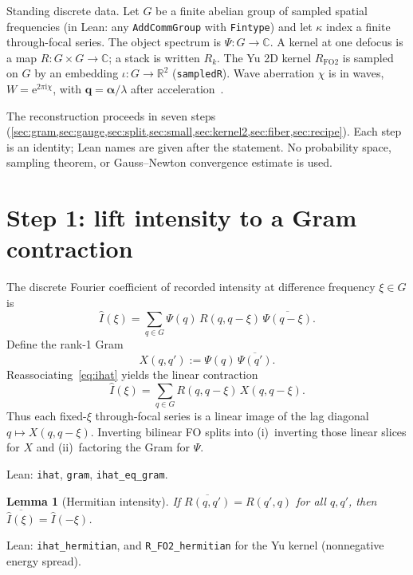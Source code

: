 \documentclass[11pt,a4paper]{article}
\newtheorem{lemma}[theorem]{Lemma}
\theoremstyle{definition}
\theoremstyle{remark}
\newcommand{\R}{\mathbb{R}}
\newcommand{\C}{\mathbb{C}}
\newcommand{\ee}{\mathrm{e}}
\newcommand{\ii}{\mathrm{i}}
\newcommand{\conj}[1]{\overline{#1}}
\newcommand{\RFOII}{R_{\mathrm{FO2}}}
\begin{document}
Standing discrete data.
Let $G$ be a finite abelian group of sampled spatial frequencies
(in Lean: any \texttt{AddCommGroup} with \texttt{Fintype}) and let
$\kappa$ index a finite through-focal series.
The object spectrum is $\Psi:G\to\C$.
A kernel at one defocus is a map $R:G\times G\to\C$; a stack is
written $R_k$.
The Yu 2D kernel $\RFOII$ is sampled on $G$ by an embedding
$\iota:G\to\R^2$ (\texttt{sampledR}).
Wave aberration $\chi$ is in waves, $W=\ee^{2\pi\ii\chi}$, with
$\mathbf{q}=\boldsymbol{\alpha}/\lambda$ after acceleration~\cite{Tromp2012,Schramm2012,Lau2026proofs}.

The reconstruction proceeds in seven steps
(\cref{sec:gram,sec:gauge,sec:split,sec:small,sec:kernel2,sec:fiber,sec:recipe}).
Each step is an identity; Lean names are given after the statement.
No probability space, sampling theorem, or Gauss--Newton convergence
estimate is used.

\section{Step 1: lift intensity to a Gram contraction}
\label{sec:gram}

The discrete Fourier coefficient of recorded intensity at difference
frequency $\xi\in G$ is
\begin{equation}
\label{eq:ihat}
\hat I(\xi)
=\sum_{q\in G}
\Psi(q)\,R(q,q-\xi)\,\conj{\Psi(q-\xi)}.
\end{equation}
Define the rank-1 Gram
\begin{equation}
\label{eq:gram}
X(q,q')
:=\Psi(q)\,\conj{\Psi(q')}.
\end{equation}
Reassociating~\eqref{eq:ihat} yields the linear contraction
\begin{equation}
\label{eq:ihatgram}
\hat I(\xi)
=\sum_{q\in G}
R(q,q-\xi)\,X(q,q-\xi).
\end{equation}
Thus each fixed-$\xi$ through-focal series is a linear image of the
lag diagonal $q\mapsto X(q,q-\xi)$.
Inverting bilinear FO splits into (i)~inverting those linear slices
for $X$ and (ii)~factoring the Gram for $\Psi$.

Lean: \texttt{ihat}, \texttt{gram}, \texttt{ihat\_eq\_gram}.

\begin{lemma}[Hermitian intensity]
\label{lem:herm}
If $\conj{R(q,q')}=R(q',q)$ for all $q,q'$, then
$\conj{\hat I(\xi)}=\hat I(-\xi)$.
\end{lemma}
Lean: \texttt{ihat\_hermitian}, and \texttt{R\_FO2\_hermitian} for the
Yu kernel (nonnegative energy spread).
\end{document}
